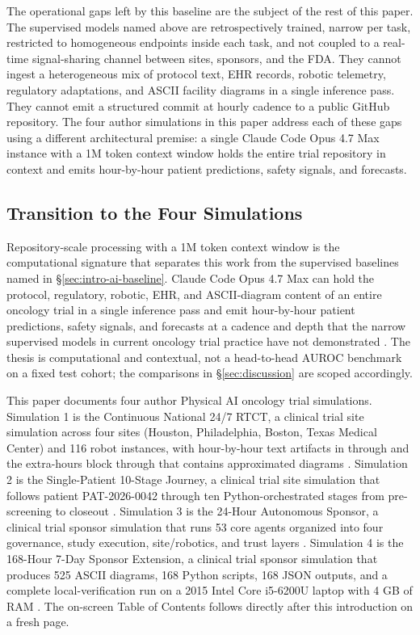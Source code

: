 The operational gaps left by this baseline are the subject of the rest
of this paper. The supervised models named above are retrospectively
trained, narrow per task, restricted to homogeneous endpoints inside
each task, and not coupled to a real-time signal-sharing channel
between sites, sponsors, and the FDA. They cannot ingest a heterogeneous
mix of protocol text, EHR records, robotic telemetry, regulatory
adaptations, and ASCII facility diagrams in a single inference pass.
They cannot emit a structured commit at hourly cadence to a public
GitHub repository. The four author simulations in this paper address
each of these gaps using a different architectural premise: a single
Claude Code Opus 4.7 Max instance with a 1M token context window holds
the entire trial repository in context and emits hour-by-hour patient
predictions, safety signals, and forecasts.

\subsection{Transition to the Four Simulations}
\label{sec:intro-transition}

Repository-scale processing with a 1M token context window is the
computational signature that separates this work from the supervised
baselines named in \S\ref{sec:intro-ai-baseline}. Claude Code Opus 4.7
Max can hold the protocol, regulatory, robotic, EHR, and ASCII-diagram
content of an entire oncology trial in a single inference pass and
emit hour-by-hour patient predictions, safety signals, and forecasts
at a cadence and depth that the narrow supervised models in current
oncology trial practice have not demonstrated
\cite{claude-opus-47, claude-code}. The thesis is computational and
contextual, not a head-to-head AUROC benchmark on a fixed test cohort;
the comparisons in \S\ref{sec:discussion} are scoped accordingly.

This paper documents four author Physical AI oncology trial
simulations. Simulation 1 is the Continuous National 24/7 RTCT, a
clinical trial site simulation across four sites (Houston,
Philadelphia, Boston, Texas Medical Center) and 116 robot instances,
with hour-by-hour text artifacts in
 through  and
the extra-hours block  through 
that contains approximated diagrams \cite{kawchak_2026_19176370,
kawchak_2026_19244918}. Simulation 2 is the Single-Patient 10-Stage
Journey, a clinical trial site simulation that follows patient
PAT-2026-0042 through ten Python-orchestrated stages from
pre-screening to closeout
\cite{kawchak_2026_19119939, kawchak_2026_18810541}. Simulation 3 is
the 24-Hour Autonomous Sponsor, a clinical trial sponsor simulation
that runs 53 core agents organized into four governance, study
execution, site/robotics, and trust layers \cite{kawchak_2026_19396256}.
Simulation 4 is the 168-Hour 7-Day Sponsor Extension, a clinical trial
sponsor simulation that produces 525 ASCII diagrams, 168 Python
scripts, 168 JSON outputs, and a complete local-verification run on a
2015 Intel Core i5-6200U laptop with 4 GB of RAM
\cite{kawchak_2026_19396256}. The on-screen Table of Contents follows
directly after this introduction on a fresh page.
